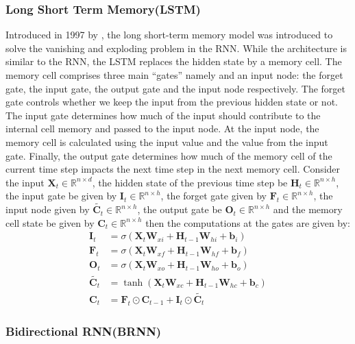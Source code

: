 \subsubsection*{Long Short Term Memory(LSTM)}
Introduced in 1997 by \cite{Hochreiter1997}, the long short-term memory model was introduced to solve the vanishing and exploding problem in the RNN. While the architecture is similar to the RNN, the LSTM replaces the hidden state by a memory cell. The memory cell comprises three main “gates” namely and an input node: the forget gate, the input gate, the output gate  and the input node respectively. The forget gate controls whether we keep the input from the previous hidden state or not.  The input gate determines how much of the input should contribute to the internal cell memory and passed to the input node. At the input node, the memory cell is calculated using the input value and the value from the input gate. Finally, the output gate determines how much of the memory cell of the current time step impacts the next time step in the next memory cell. Consider the input $\mathbf{X}_t \in \mathbb{R}^{n \times d}$, the hidden state of the previous time step be  $\mathbf{H}_t \in \mathbb{R}^{n \times h}$, the input gate be given by $\mathbf{I}_t \in \mathbb{R}^{n \times h}$, the forget gate given by $\mathbf{F}_t \in \mathbb{R}^{n \times h}$, the input node given by $\tilde{\mathbf{C}_t} \in \mathbb{R}^{n \times h}$,  the output gate be $\mathbf{O}_t \in \mathbb{R}^{n \times h}$ and the memory cell state be given by $\mathbf{C}_t \in \mathbb{R}^{n \times h}$ then the computations at the gates are given by:
\begin{align}
  \label{eq:LSTM_HS}
  \mathbf{I}_t &= \sigma(\mathbf{X}_t \mathbf{W}_{xi} + \mathbf{H}_{t-1}\mathbf{W}_{hi} + \mathbf{b}_i) \\
  \mathbf{F}_t &= \sigma(\mathbf{X}_t \mathbf{W}_{xf} + \mathbf{H}_{t-1}\mathbf{W}_{hf} + \mathbf{b}_f) \\
  \mathbf{O}_t &= \sigma(\mathbf{X}_t \mathbf{W}_{xo} + \mathbf{H}_{t-1}\mathbf{W}_{ho} + \mathbf{b}_o) \\
  \tilde{\mathbf{C}_t} &= \tanh(\mathbf{X}_t \mathbf{W}_{xc} + \mathbf{H}_{t-1}\mathbf{W}_{hc} + \mathbf{b}_c)\\
  \mathbf{C}_t &= \mathbf{F}_t \odot \mathbf{C}_{t-1} + \mathbf{I}_t \odot \tilde{\mathbf{C}_t}
\end{align}


\subsubsection*{Bidirectional RNN(BRNN)}
